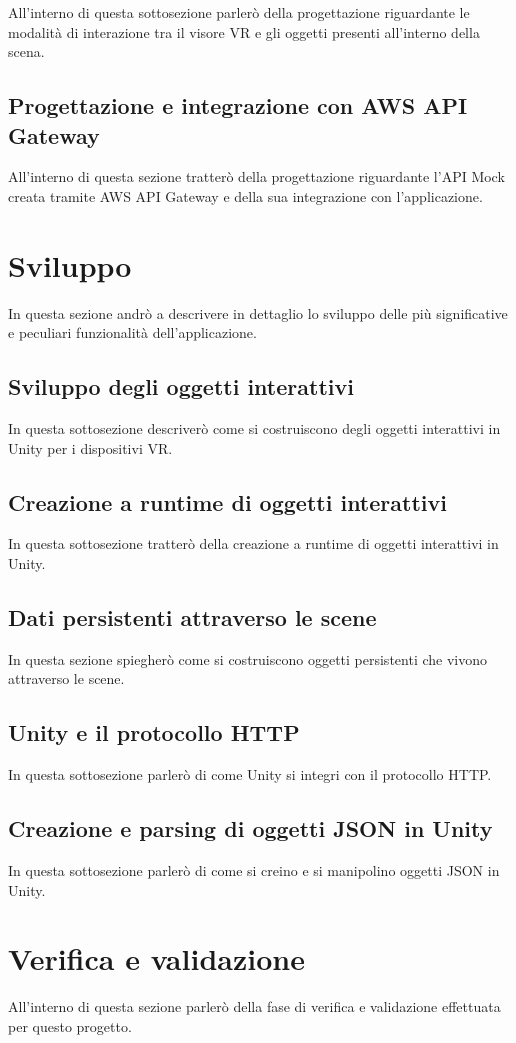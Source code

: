 All'interno di questa sottosezione parlerò della progettazione riguardante le modalità di interazione tra il visore VR e gli oggetti presenti all'interno della scena.

\subsection{Progettazione e integrazione con AWS API Gateway}

All'interno di questa sezione tratterò della progettazione riguardante l'API Mock creata tramite AWS API Gateway e della sua integrazione con l'applicazione.

\section{Sviluppo}

In questa sezione andrò a descrivere in dettaglio lo sviluppo delle più significative e peculiari funzionalità dell'applicazione.

\subsection{Sviluppo degli oggetti interattivi}

In questa sottosezione descriverò come si costruiscono degli oggetti interattivi in Unity per i dispositivi VR.

\subsection{Creazione a runtime di oggetti interattivi}

In questa sottosezione tratterò della creazione a runtime di oggetti interattivi in Unity.

\subsection{Dati persistenti attraverso le scene}

In questa sezione spiegherò come si costruiscono oggetti persistenti che vivono attraverso le scene.

\subsection{Unity e il protocollo HTTP}

In questa sottosezione parlerò di come Unity si integri con il protocollo HTTP.

\subsection{Creazione e parsing di oggetti JSON in Unity}

In questa sottosezione parlerò di come si creino e si manipolino oggetti JSON in Unity.

\section{Verifica e validazione}

All'interno di questa sezione parlerò della fase di verifica e validazione effettuata per questo progetto.
